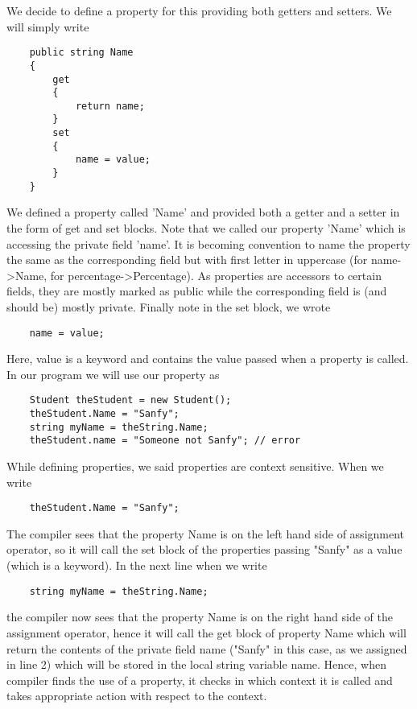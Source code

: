 We decide to define a property for this providing both getters and setters. We will simply write

\begin{lstlisting}
    public string Name
    {
        get
        {
            return name;
        }
        set
        {
            name = value;
        }
    }        
\end{lstlisting}

We defined a property called ’Name’ and provided both a getter and a setter in the form of get { } and set { } blocks.
Note that we called our property ’Name’ which is accessing the private field ’name’. It is becoming convention to
name the property the same as the corresponding field but with first letter in uppercase (for name->Name, for
percentage->Percentage). As properties are accessors to certain fields, they are mostly marked as public while the
corresponding field is (and should be) mostly private. Finally note in the set { } block, we wrote

\begin{lstlisting}
    name = value;    
\end{lstlisting}

Here, value is a keyword and contains the value passed when a property is called. In our program we will use our
property as

\begin{lstlisting}
    Student theStudent = new Student();
    theStudent.Name = "Sanfy";
    string myName = theString.Name;
    theStudent.name = "Someone not Sanfy"; // error        
\end{lstlisting}

While defining properties, we said properties are context sensitive. When we write

\begin{lstlisting}
    theStudent.Name = "Sanfy";    
\end{lstlisting}

The compiler sees that the property Name is on the left hand side of assignment operator, so it will call the set { }
block of the properties passing "Sanfy" as a value (which is a keyword). In the next line when we write

\begin{lstlisting}
    string myName = theString.Name;    
\end{lstlisting}

the compiler now sees that the property Name is on the right hand side of the assignment operator, hence it will call
the get { } block of property Name which will return the contents of the private field name ("Sanfy" in this case, as
we assigned in line 2) which will be stored in the local string variable name. Hence, when compiler finds the use of
a property, it checks in which context it is called and takes appropriate action with respect to the context.

